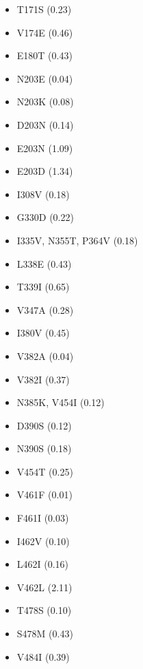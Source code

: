 \documentclass[11pt,oneside,letterpaper]{article}
\begin{document}
\begin{table}[ht]
\begin{multicols}{3}
\begin{itemize}
      \item T171S (0.23)
      \item V174E (0.46)
      \item E180T (0.43)
      \item N203E (0.04)
      \item N203K (0.08)
      \item D203N (0.14)
      \item E203N (1.09)
      \item E203D (1.34)
      \item I308V (0.18)
      \item G330D (0.22)
      \item I335V, N355T, P364V (0.18)
      \item L338E (0.43)
      \item T339I (0.65)
      \item V347A (0.28)
      \item I380V (0.45)
      \item V382A (0.04)
      \item V382I (0.37)
      \item N385K, V454I (0.12)
      \item D390S (0.12)
      \item N390S (0.18)
      \item V454T (0.25)
      \item V461F (0.01)
      \item F461I (0.03)
      \item I462V (0.10)
      \item L462I (0.16)
      \item V462L (2.11)
      \item T478S (0.10)
      \item S478M (0.43)
      \item V484I (0.39)
    \end{itemize}
  \end{multicols}
\end{table}
\end{document}
